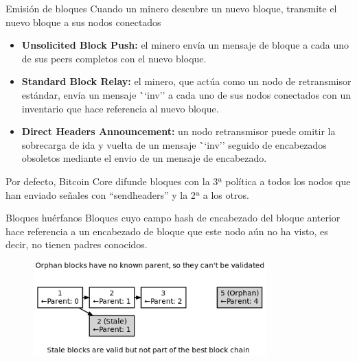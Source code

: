 \documentclass[compress,brown,xcolor=table]{beamer}
\begin{document}
\begin{frame}{Emisión de bloques}
Cuando un minero descubre un nuevo bloque, transmite el nuevo bloque a sus nodos conectados

\begin{itemize}

	\item \textbf{Unsolicited Block Push:} el minero envía un mensaje de bloque a cada uno de sus peers completos con el nuevo bloque.\\

	\item \textbf{Standard Block Relay:} el minero, que actúa como un nodo de retransmisor estándar, envía un mensaje \```inv'' a cada uno de sus nodos conectados con un inventario que hace referencia al nuevo bloque.\\

	\item \textbf{Direct Headers Announcement:} un nodo retransmisor puede omitir la sobrecarga de ida y vuelta de un mensaje \```inv'' seguido de encabezados obsoletos mediante el envio de un mensaje de encabezado.

\end{itemize}

Por defecto, Bitcoin Core difunde bloques con la 3ª política a todos los nodos que han enviado señales con ``sendheaders'' y la 2ª a los otros.
\end{frame}

\begin{frame}{Bloques huérfanos}
Bloques cuyo campo hash de encabezado del bloque anterior hace referencia a un encabezado de bloque que este nodo aún no ha visto, es decir, no tienen padres conocidos.\\

\begin{figure}[h]
	\includegraphics[width=9cm]{../images/Image4.png}
	\centering		
	\label{p5}
\end{figure}
\end{frame}
\end{document}
